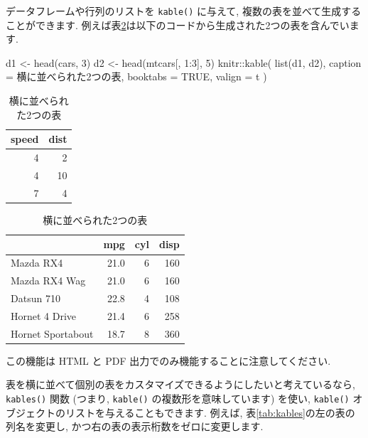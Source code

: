 \documentclass[
  11pt,
  lualatex,ja=standard,jafont=noto]{bxjsreport}
\newenvironment{Shaded}{\begin{snugshade}}{\end{snugshade}}
\newcommand{\AttributeTok}[1]{\textcolor[rgb]{0.77,0.63,0.00}{#1}}
\newcommand{\ConstantTok}[1]{\textcolor[rgb]{0.00,0.00,0.00}{#1}}
\newcommand{\DecValTok}[1]{\textcolor[rgb]{0.00,0.00,0.81}{#1}}
\newcommand{\FunctionTok}[1]{\textcolor[rgb]{0.00,0.00,0.00}{#1}}
\newcommand{\NormalTok}[1]{#1}
\newcommand{\OtherTok}[1]{\textcolor[rgb]{0.56,0.35,0.01}{#1}}
\newcommand{\SpecialCharTok}[1]{\textcolor[rgb]{0.00,0.00,0.00}{#1}}
\newcommand{\StringTok}[1]{\textcolor[rgb]{0.31,0.60,0.02}{#1}}
\begin{document}
データフレームや行列のリストを \texttt{kable()} に与えて, 複数の表を並べて生成することができます. 例えば表\ref{tab:two-tables}は以下のコードから生成された2つの表を含んでいます.

\begin{Shaded}
\begin{Highlighting}[numbers=left,,]
\NormalTok{d1 }\OtherTok{\textless{}{-}} \FunctionTok{head}\NormalTok{(cars, }\DecValTok{3}\NormalTok{)}
\NormalTok{d2 }\OtherTok{\textless{}{-}} \FunctionTok{head}\NormalTok{(mtcars[, }\DecValTok{1}\SpecialCharTok{:}\DecValTok{3}\NormalTok{], }\DecValTok{5}\NormalTok{)}
\NormalTok{knitr}\SpecialCharTok{::}\FunctionTok{kable}\NormalTok{(}
  \FunctionTok{list}\NormalTok{(d1, d2),}
  \AttributeTok{caption =} \StringTok{\textquotesingle{}横に並べられた2つの表\textquotesingle{}}\NormalTok{,}
  \AttributeTok{booktabs =} \ConstantTok{TRUE}\NormalTok{, }\AttributeTok{valign =} \StringTok{\textquotesingle{}t\textquotesingle{}}
\NormalTok{)}
\end{Highlighting}
\end{Shaded}

\begin{table}
\caption{\label{tab:two-tables}横に並べられた2つの表}

\centering
\begin{tabular}[t]{rr}
\toprule
speed & dist\\
\midrule
4 & 2\\
4 & 10\\
7 & 4\\
\bottomrule
\end{tabular}
\centering
\begin{tabular}[t]{lrrr}
\toprule
  & mpg & cyl & disp\\
\midrule
Mazda RX4 & 21.0 & 6 & 160\\
Mazda RX4 Wag & 21.0 & 6 & 160\\
Datsun 710 & 22.8 & 4 & 108\\
Hornet 4 Drive & 21.4 & 6 & 258\\
Hornet Sportabout & 18.7 & 8 & 360\\
\bottomrule
\end{tabular}
\end{table}

この機能は HTML と PDF 出力でのみ機能することに注意してください.

表を横に並べて個別の表をカスタマイズできるようにしたいと考えているなら, \texttt{kables()} 関数 (つまり, \texttt{kable()} の複数形を意味しています) を使い, \texttt{kable()} オブジェクトのリストを与えることもできます. 例えば, 表\ref{tab:kables}の左の表の列名を変更し, かつ右の表の表示桁数をゼロに変更します.
\end{document}
